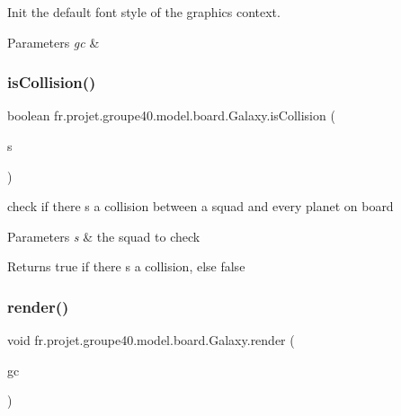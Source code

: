 Init the default font style of the graphics context. 


\begin{DoxyParams}{Parameters}
{\em gc} & \\
\hline
\end{DoxyParams}
\mbox{\label{classfr_1_1projet_1_1groupe40_1_1model_1_1board_1_1_galaxy_af0fc1142e337409617e0508c57ecce55}} 
\subsubsection{\texorpdfstring{is\+Collision()}{isCollision()}}
{\footnotesize\ttfamily boolean fr.\+projet.\+groupe40.\+model.\+board.\+Galaxy.\+is\+Collision (\begin{DoxyParamCaption}\item[{\hyperlink{classfr_1_1projet_1_1groupe40_1_1model_1_1ships_1_1_squad}{Squad}}]{s }\end{DoxyParamCaption})}



check if there s a collision between a squad and every planet on board 


\begin{DoxyParams}{Parameters}
{\em s} & the squad to check \\
\hline
\end{DoxyParams}
\begin{DoxyReturn}{Returns}
true if there s a collision, else false 
\end{DoxyReturn}
\mbox{\label{classfr_1_1projet_1_1groupe40_1_1model_1_1board_1_1_galaxy_a4d87d109c4c08d5b6047b7fe6c35a2e6}} 
\subsubsection{\texorpdfstring{render()}{render()}}
{\footnotesize\ttfamily void fr.\+projet.\+groupe40.\+model.\+board.\+Galaxy.\+render (\begin{DoxyParamCaption}\item[{Graphics\+Context}]{gc }\end{DoxyParamCaption})}

